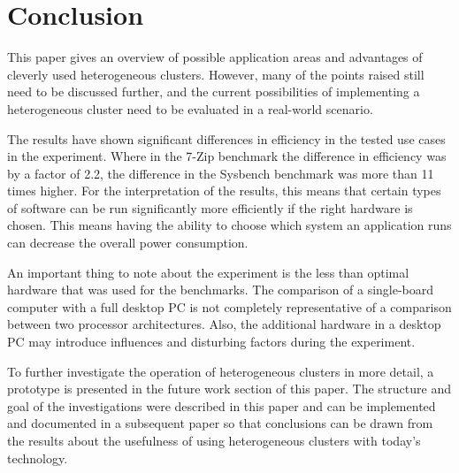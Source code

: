 \section{Conclusion}
This paper gives an overview of possible application areas and advantages of cleverly used heterogeneous clusters.  
However, many of the points raised still need to be discussed further, 
and the current possibilities of implementing a heterogeneous cluster need to be evaluated in a real-world scenario.

The results have shown significant differences in efficiency in the tested use cases in the experiment.
Where in the 7-Zip benchmark the difference in efficiency was by a factor of 2.2, the difference in the Sysbench benchmark was more than 11 times higher.
For the interpretation of the results, this means that certain types of software can be run significantly more efficiently if the right hardware is chosen. 
This means having the ability to choose which system an application runs can decrease the overall power consumption.

An important thing to note about the experiment is the less than optimal hardware that was used for the benchmarks.
The comparison of a single-board computer with a full desktop PC is not completely representative of a comparison between two processor architectures. Also, the additional hardware in a desktop PC may introduce influences and disturbing
factors during the experiment.

To further investigate the operation of
heterogeneous clusters in more detail, 
a prototype is presented in the future work section of this paper.
The structure and goal of the investigations were described
in this paper and can be implemented and documented 
in a subsequent paper so that conclusions can be drawn from
the results about the usefulness of using heterogeneous
clusters with today's technology.
